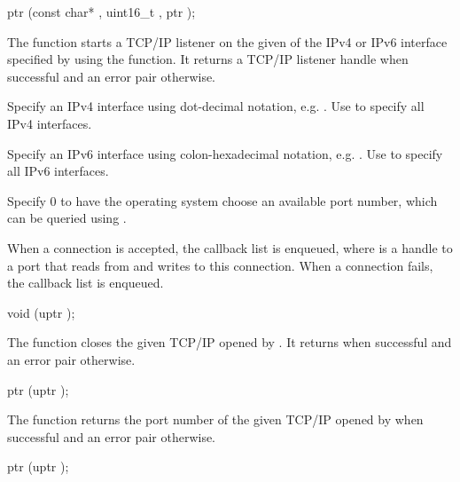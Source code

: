 \begin{function}
  ptr (const char* , uint16\_t , ptr );
\end{function}

The  function starts a TCP/IP listener on the
given  of the IPv4 or IPv6 interface specified by
 using the  function. It returns a
TCP/IP listener handle when successful and an error pair otherwise.

Specify an IPv4 interface  using dot-decimal notation,
e.g. . Use  to specify all IPv4
interfaces.

Specify an IPv6 interface  using colon-hexadecimal
notation, e.g. . Use \code{::} to specify all IPv6
interfaces.

Specify  0 to have the operating system choose an available
port number, which can be queried using
.

When a connection is accepted, the callback list
 is enqueued, where  is a
handle to a port that reads from and writes to this connection. When a
connection fails, the callback list  is enqueued.

\begin{function}
  void (uptr );
\end{function}

The  function closes the given TCP/IP
 opened by . It returns
 when successful and an error pair otherwise.

\begin{function}
  ptr (uptr );
\end{function}

The  function returns the port
number of the given TCP/IP  opened by
 when successful and an error pair otherwise.

\begin{function}
  ptr (uptr );
\end{function}

